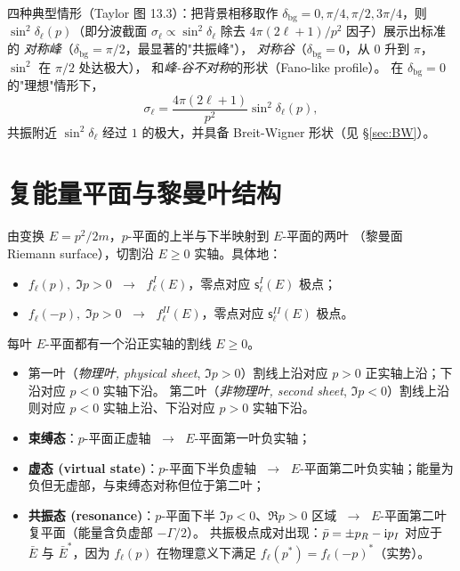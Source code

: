 \begin{remark}
  四种典型情形（Taylor 图 13.3）：把背景相移取作
  $\delta_{\mathrm{bg}}=0,\pi/4,\pi/2,3\pi/4$，则
  $\sin^2\delta_\ell(p)$（即分波截面 $\sigma_\ell\propto\sin^2\delta_\ell$
  除去 $4\pi(2\ell+1)/p^2$ 因子）展示出标准的
  \emph{对称峰}（$\delta_{\mathrm{bg}}=\pi/2$，最显著的"共振峰"），
  \emph{对称谷}（$\delta_{\mathrm{bg}}=0$，从 0 升到 $\pi$，$\sin^2$ 在 $\pi/2$ 处达极大），
  和\emph{峰-谷不对称}的形状（Fano-like profile）。
  在 $\delta_{\mathrm{bg}}=0$ 的"理想"情形下，
  \begin{equation}
    \sigma_\ell=\frac{4\pi(2\ell+1)}{p^2}\sin^2\delta_\ell(p),
  \end{equation}
  共振附近 $\sin^2\delta_\ell$ 经过 $1$ 的极大，并具备
  Breit-Wigner 形状（见 \S\ref{sec:BW}）。
\end{remark}

\section{复能量平面与黎曼叶结构}\label{sec:Eplane}

由变换 $E=p^2/2m$，$p$-平面的上半与下半映射到 $E$-平面的两叶
（黎曼面 Riemann surface），切割沿 $E\geq 0$ 实轴。具体地：
\begin{itemize}
  \item $f_\ell(p),\;\Im p>0$ $\;\longrightarrow\;$ $f_\ell^I(E)$，零点对应 $\mathsf{s}_\ell^I(E)$ 极点；
  \item $f_\ell(-p),\;\Im p>0$ $\;\longrightarrow\;$ $f_\ell^{II}(E)$，零点对应 $\mathsf{s}_\ell^{II}(E)$ 极点。
\end{itemize}
每叶 $E$-平面都有一个沿正实轴的割线 $E\geq 0$。
\begin{itemize}
  \item 第一叶（\emph{物理叶, physical sheet}, $\Im p>0$）割线上沿对应
    $p>0$ 正实轴上沿；下沿对应 $p<0$ 实轴下沿。
    第二叶（\emph{非物理叶, second sheet}, $\Im p<0$）割线上沿则对应
    $p<0$ 实轴上沿、下沿对应 $p>0$ 实轴下沿。
  \item \textbf{束缚态}：$p$-平面正虚轴 $\;\to\;$ $E$-平面第一叶负实轴；
  \item \textbf{虚态 (virtual state)}：$p$-平面下半负虚轴 $\;\to\;$
    $E$-平面第二叶负实轴；能量为负但无虚部，与束缚态对称但位于第二叶；
  \item \textbf{共振态 (resonance)}：$p$-平面下半 $\Im p<0$、$\Re p>0$ 区域
    $\;\to\;$ $E$-平面第二叶复平面（能量含负虚部 $-\Gamma/2$）。
    共振极点成对出现：$\bar p=\pm p_R-\mathrm{i} p_I$ 对应于
    $\bar E$ 与 $\bar E^*$，因为 $f_\ell(p)$ 在物理意义下满足
    $f_\ell(p^*)=f_\ell(-p)^*$（实势）。
\end{itemize}

